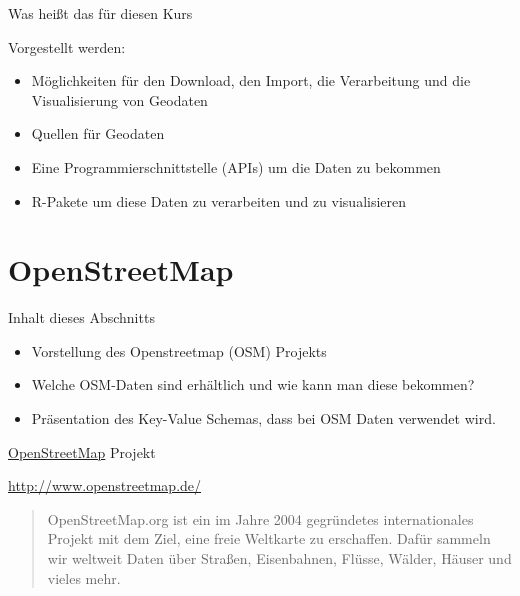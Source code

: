 \documentclass[ignorenonframetext,]{beamer}
\providecommand{\tightlist}{%
  \setlength{\itemsep}{0pt}\setlength{\parskip}{0pt}}
\begin{document}
\begin{frame}{Was heißt das für diesen Kurs}

\begin{block}{Vorgestellt werden:}

\begin{itemize}
\tightlist
\item
  Möglichkeiten für den Download, den Import, die Verarbeitung und die
  Visualisierung von Geodaten
\end{itemize}

\begin{itemize}
\tightlist
\item
  Quellen für Geodaten
\item
  Eine Programmierschnittstelle (APIs) um die Daten zu bekommen
\item
  R-Pakete um diese Daten zu verarbeiten und zu visualisieren
\end{itemize}

\end{block}

\end{frame}

\section{OpenStreetMap}\label{openstreetmap}

\begin{frame}{Inhalt dieses Abschnitts}

\begin{itemize}
\tightlist
\item
  Vorstellung des Openstreetmap (OSM) Projekts
\item
  Welche OSM-Daten sind erhältlich und wie kann man diese bekommen?
\item
  Präsentation des Key-Value Schemas, dass bei OSM Daten verwendet wird.
\end{itemize}

\end{frame}

\begin{frame}{\href{http://www.openstreetmap.de/}{OpenStreetMap}
Projekt}

\begin{block}{\url{http://www.openstreetmap.de/}}

\begin{quote}
OpenStreetMap.org ist ein im Jahre 2004 gegründetes internationales
Projekt mit dem Ziel, eine freie Weltkarte zu erschaffen. Dafür sammeln
wir weltweit Daten über Straßen, Eisenbahnen, Flüsse, Wälder, Häuser und
vieles mehr.
\end{quote}

\end{block}

\end{frame}
\end{document}

